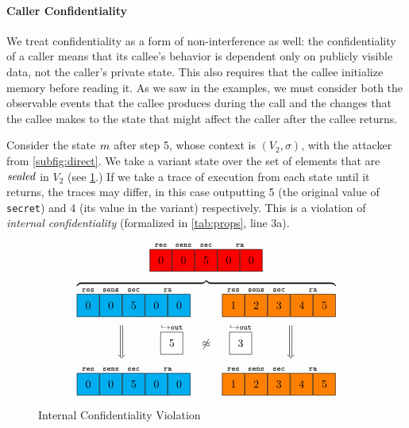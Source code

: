 \documentclass[10pt,conference]{ieeetran}%
\theoremstyle{definition}
\begin{document}
\paragraph*{Caller Confidentiality}

We treat confidentiality as a form of non-interference as well: the confidentiality of a caller
means that its callee's behavior is dependent only on publicly visible data,
not the caller's private state. This also requires that the callee initialize
memory before reading it.
As we saw in the examples, we must consider both the observable events
that the callee produces during the call and the changes that the callee makes to the state that might
affect the caller after the callee returns.

Consider the state \(m\) after step 5, whose context is \((V_2,\sigma)\), with the attacker from
\cref{subfig:direct}. We take a variant state over the set of elements that are
\(\mathit{sealed}\) in \(V_2\) (see \cref{fig:variant2}.)
If we take a trace of execution from each state until it returns,
the traces may differ, in this case outputting 5 (the original value of {\tt secret}) and
4 (its value in the variant) respectively. This is a violation of
{\it internal confidentiality} (formalized in \cref{tab:props}, line 3a).

\newcommand{\leftbox}[1][]{\genbox{20px}{\leftvariant}{#1}}
\newcommand{\rightbox}[1][]{\genbox{20px}{\rightvariant}{#1}}

\begin{figure}
    \centering
    \[
    \stackrel{\texttt{res}}{\figfourbox[0]}
    \stackrel{\texttt{sens}}{\figfourbox[0]}
    \stackrel{\texttt{sec}}{\figfourbox[5]}
    \stackrel{\texttt{ra}}{\figfourbox[0]\figfourbox[0]}\]
    \[\overbrace{
    \stackrel{\texttt{res}}{\leftbox[0]}
    \stackrel{\texttt{sens}}{\leftbox[0]}
    \stackrel{\texttt{sec}}{\leftbox[5]}
    \stackrel{\texttt{ra}}{\leftbox[0]\leftbox[0]}
    \hspace{1cm}
    \stackrel{\texttt{res}}{\rightbox[1]}
    \stackrel{\texttt{sens}}{\rightbox[2]}
    \stackrel{\texttt{sec}}{\rightbox[3]}
    \stackrel{\texttt{ra}}{\rightbox[4]\rightbox[5]}}
    \]
    \[\raisebox{.5\height}{\Bigg\Downarrow} \hspace{1cm}
    \stackrel{\hookrightarrow \mathtt{out}}{\genbox{20px}{white}{5}} \hspace{0.5cm}
    \raisebox{\height}{\(\not\approx\)}
    \hspace{0.5cm}
    \stackrel{\hookrightarrow \mathtt{out}}{\genbox{20px}{white}{3}} \hspace{1cm}
    \raisebox{.5\height}{\Bigg\Downarrow}
    \]
    \[
    \stackrel{\texttt{res}}{\leftbox[0]}
    \stackrel{\texttt{sens}}{\leftbox[0]}
    \stackrel{\texttt{sec}}{\leftbox[5]}
    \stackrel{\texttt{ra}}{\leftbox[0]\leftbox[0]}
    \hspace{1cm}
    \stackrel{\texttt{res}}{\rightbox[1]}
    \stackrel{\texttt{sens}}{\rightbox[2]}
    \stackrel{\texttt{sec}}{\rightbox[3]}
    \stackrel{\texttt{ra}}{\rightbox[4]\rightbox[5]}
    \]

  \caption{Internal Confidentiality Violation}
  \label{fig:variant2}
\end{figure}
\end{document}
